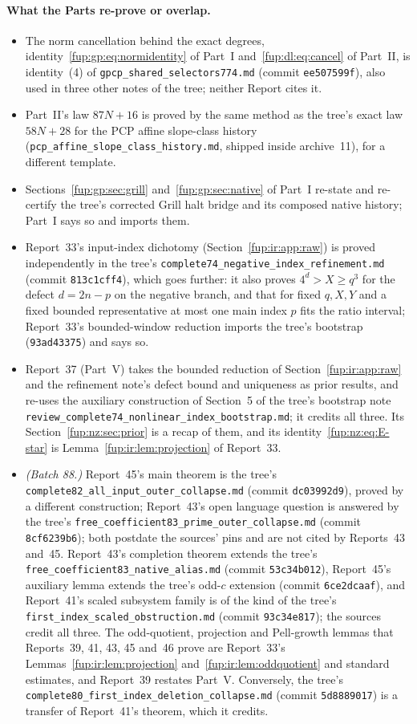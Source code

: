 \documentclass[11pt,letterpaper]{article}
\theoremstyle{definition}\newtheorem{definition}[theorem]{Definition}
\theoremstyle{remark}\newtheorem{remark}[theorem]{Remark}
\newcommand{\rw}[1]{\nolinkurl{#1}}%
\begin{document}
\paragraph{What the Parts re-prove or overlap.}
\begin{itemize}
\item The norm cancellation behind the exact degrees, identity~\eqref{fup:gp:eq:normidentity} of Part~I and~\eqref{fup:dl:eq:cancel} of Part~II, is identity~(4) of \rw{gpcp_shared_selectors774.md} (commit \texttt{ee507599f}), also used in three other notes of the tree; neither Report cites it.
\item Part~II's law $87N+16$ is proved by the same method as the tree's exact law $58N+28$ for the PCP affine slope-class history (\rw{pcp_affine_slope_class_history.md}, shipped inside archive~11), for a different template.
\item Sections~\ref{fup:gp:sec:grill} and~\ref{fup:gp:sec:native} of Part~I re-state and re-certify the tree's corrected Grill halt bridge and its composed native history; Part~I says so and imports them.
\item Report~33's input-index dichotomy (Section~\ref{fup:ir:app:raw}) is proved independently in the tree's \rw{complete74_negative_index_refinement.md} (commit \texttt{813c1cff4}), which goes further: it also proves $4^d>X\ge q^3$ for the defect $d=2n-p$ on the negative branch, and that for fixed $q,X,Y$ and a fixed bounded representative at most one main index $p$ fits the ratio interval; Report~33's bounded-window reduction imports the tree's bootstrap (\texttt{93ad43375}) and says so.
\item Report~37 (Part~V) takes the bounded reduction of Section~\ref{fup:ir:app:raw} and the refinement note's defect bound and uniqueness as prior results, and re-uses the auxiliary construction of Section~5 of the tree's bootstrap note \rw{review_complete74_nonlinear_index_bootstrap.md}; it credits all three. Its Section~\ref{fup:nz:sec:prior} is a recap of them, and its identity~\eqref{fup:nz:eq:E-star} is Lemma~\ref{fup:ir:lem:projection} of Report~33.
\item \emph{(Batch 88.)} Report~45's main theorem is the tree's \rw{complete82_all_input_outer_collapse.md} (commit \texttt{dc03992d9}), proved by a different construction; Report~43's open language question is answered by the tree's \rw{free_coefficient83_prime_outer_collapse.md} (commit \texttt{8cf6239b6}); both postdate the sources' pins and are not cited by Reports~43 and~45. Report~43's completion theorem extends the tree's \rw{free_coefficient83_native_alias.md} (commit \texttt{53c34b012}), Report~45's auxiliary lemma extends the tree's odd-$c$ extension (commit \texttt{6ce2dcaaf}), and Report~41's scaled subsystem family is of the kind of the tree's \rw{first_index_scaled_obstruction.md} (commit \texttt{93c34e817}); the sources credit all three. The odd-quotient, projection and Pell-growth lemmas that Reports~39, 41, 43, 45 and~46 prove are Report~33's Lemmas~\ref{fup:ir:lem:projection} and~\ref{fup:ir:lem:oddquotient} and standard estimates, and Report~39 restates Part~V. Conversely, the tree's \rw{complete80_first_index_deletion_collapse.md} (commit \texttt{5d8889017}) is a transfer of Report~41's theorem, which it credits.

\end{itemize}
\end{document}
